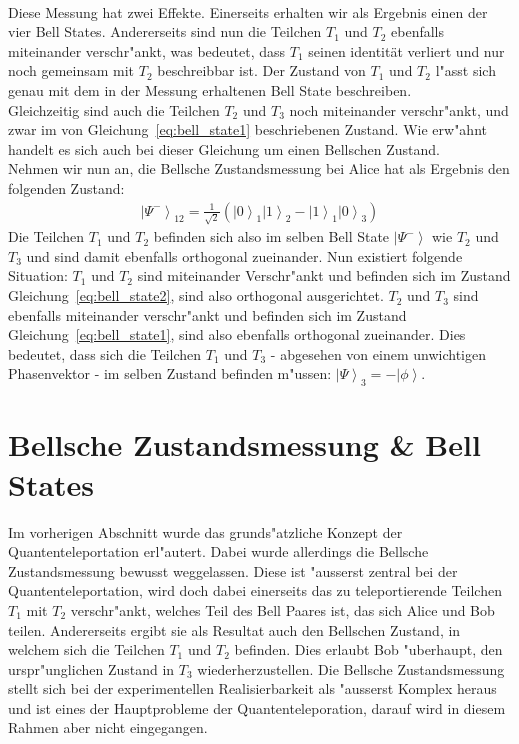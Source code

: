 \begin{refsection}
\\
Diese Messung hat zwei Effekte. Einerseits erhalten wir als Ergebnis einen der vier Bell States. Andererseits sind nun die Teilchen $T_{1}$ und $T_{2}$ ebenfalls miteinander verschr"ankt, was bedeutet, dass $T_{1}$ seinen identität verliert und nur noch gemeinsam mit $T_{2}$ beschreibbar ist. Der Zustand von $T_{1}$ und $T_{2}$ l"asst sich genau mit dem in der Messung erhaltenen Bell State beschreiben. 
\\
Gleichzeitig sind auch die Teilchen $T_{2}$ und $T_{3}$ noch miteinander verschr"ankt, und zwar im von Gleichung~\ref{eq:bell_state1} beschriebenen Zustand. Wie erw"ahnt handelt es sich auch bei dieser Gleichung um einen Bellschen Zustand.
\\
Nehmen wir nun an, die Bellsche Zustandsmessung bei Alice hat als Ergebnis den folgenden Zustand:
\begin{align}\label{eq:bell_state2}
\left|\Psi^{-}\right\rangle_{12} = \frac{1}{\sqrt{2}} ( \left|0\right\rangle_{1}\left|1\right\rangle_{2} - \left|1\right\rangle_{1}\left|0\right\rangle_{3} )
\end{align}
Die Teilchen $T_{1}$ und $T_{2}$ befinden sich also im selben Bell State $\left| \Psi^{-} \right \rangle$ wie $T_{2}$ und $T_{3}$ und sind damit ebenfalls orthogonal zueinander. Nun existiert folgende Situation: $T_{1}$ und $T_{2}$ sind miteinander Verschr"ankt und befinden sich im Zustand Gleichung~\ref{eq:bell_state2}, sind also orthogonal ausgerichtet. $T_{2}$ und $T_{3}$ sind ebenfalls miteinander verschr"ankt und befinden sich im Zustand Gleichung~\ref{eq:bell_state1}, sind also ebenfalls orthogonal zueinander. Dies bedeutet, dass sich die Teilchen $T_{1}$ und $T_{3}$ - abgesehen von einem unwichtigen Phasenvektor - im selben Zustand befinden m"ussen: $\left| \Psi\right\rangle_{3} = -\left|\phi\right\rangle$.
\section{Bellsche Zustandsmessung \& Bell States}
Im vorherigen Abschnitt wurde das grunds"atzliche Konzept der Quantenteleportation erl"autert. Dabei wurde allerdings die Bellsche Zustandsmessung bewusst weggelassen. Diese ist "ausserst zentral bei der Quantenteleportation, wird doch dabei einerseits das zu teleportierende Teilchen $T_{1}$ mit $T_{2}$ verschr"ankt, welches Teil des Bell Paares ist, das sich Alice und Bob teilen. Andererseits ergibt sie als Resultat auch den Bellschen Zustand, in welchem sich die Teilchen $T_{1}$ und $T_{2}$ befinden. Dies erlaubt Bob "uberhaupt, den urspr"unglichen Zustand in $T_{3}$ wiederherzustellen. Die Bellsche Zustandsmessung stellt sich bei der experimentellen Realisierbarkeit als "ausserst Komplex heraus und ist eines der Hauptprobleme der Quantenteleporation, darauf wird in diesem Rahmen aber nicht eingegangen.


\end{refsection}

